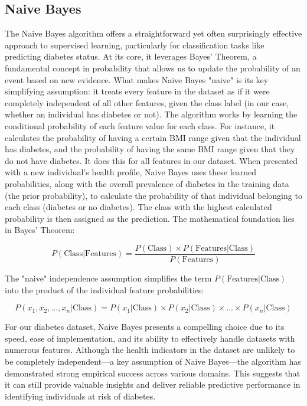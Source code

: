 \subsection{Naive Bayes}
The Naive Bayes algorithm offers a straightforward yet often surprisingly effective approach to supervised learning, particularly for classification tasks like predicting diabetes status. At its core, it leverages Bayes' Theorem, a fundamental concept in probability that allows us to update the probability of an event based on new evidence. What makes Naive Bayes "naive" is its key simplifying assumption: it treats every feature in the dataset as if it were completely independent of all other features, given the class label (in our case, whether an individual has diabetes or not).
The algorithm works by learning the conditional probability of each feature value for each class. For instance, it calculates the probability of having a certain BMI range given that the individual has diabetes, and the probability of having the same BMI range given that they do not have diabetes. It does this for all features in our dataset. When presented with a new individual's health profile, Naive Bayes uses these learned probabilities, along with the overall prevalence of diabetes in the training data (the prior probability), to calculate the probability of that individual belonging to each class (diabetes or no diabetes). The class with the highest calculated probability is then assigned as the prediction.
The mathematical foundation lies in Bayes' Theorem:

$$P(\text{Class}|\text{Features}) = \frac{P(\text{Class}) \times P(\text{Features}|\text{Class})}{P(\text{Features})}$$

The "naive" independence assumption simplifies the term $P(\text{Features}|\text{Class})$ into the product of the individual feature probabilities:

$$P(x_1, x_2, ..., x_n|\text{Class}) = P(x_1|\text{Class}) \times P(x_2|\text{Class}) \times ... \times P(x_n|\text{Class})$$


For our diabetes dataset, Naive Bayes presents a compelling choice due to its speed, ease of implementation, and its ability to effectively handle datasets with numerous features. Although the health indicators in the dataset are unlikely to be completely independent—a key assumption of Naive Bayes—the algorithm has demonstrated strong empirical success across various domains. This suggests that it can still provide valuable insights and deliver reliable predictive performance in identifying individuals at risk of diabetes.

